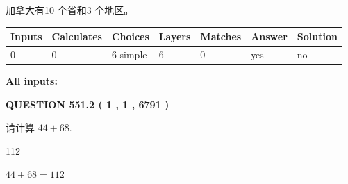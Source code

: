 \documentclass{ctexart}
\begin{document}
 
加拿大有10 个省和3 个地区。
 
 
\noindent{}
 
 
   
   
   
   
\noindent\begin{tabular}{|l|l|l|l|l|l|l|}
 \hline
Inputs & Calculates & Choices & Layers & Matches & Answer & Solution \\ \hline
 0  & 
 0  & 
 6
  simple  
  & 
 6  & 
 0  & 
  yes & 
  no 
  \\ \hline
 \end{tabular}
   
   
   
   
\noindent{}
   
   
   
   
\noindent\vspace{0.1in}\hspace{-0.08in} {\textbf{\Large{All inputs: }}}
   
   
  
\vspace{0.2in}
  
{\textbf{\Large{QUESTION
551.2 
 ( 1 , 1 , 6791 )
}}}
  
  
 
请计算 $ %
44 +  %
68 $.
 
 
 
\noindent{}
 
 

112
 
 
\noindent{}
 
 

 
 
 
\noindent{}
 
 

$ %
44 +  %
68=   %
112$
 
 
\noindent{}
 
 

 
   
   
   
\end{document}
